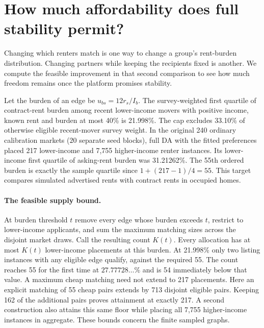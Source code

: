 \section{How much affordability does full stability permit?}\label{sec:burden}
Changing which renters match is one way to change a group's rent-burden distribution. Changing partners while keeping the recipients fixed is another. We compute the feasible improvement in that second comparison to see how much freedom remains once the platform promises stability.

Let the burden of an edge be $u_{bs}=12r_s/I_b$. The survey-weighted first quartile of contract-rent burden among recent lower-income movers with positive income, known rent and burden at most 40\% is 21.998\%. The cap excludes 33.10\% of otherwise eligible recent-mover survey weight. In the original 240 ordinary calibration markets ($20$ separate seed blocks), full DA with the fitted preferences placed 217 lower-income and 7,755 higher-income renter instances. Its lower-income first quartile of asking-rent burden was 31.21262\%. The 55th ordered burden is exactly the sample quartile since $1+(217-1)/4=55$. This target compares simulated advertised rents with contract rents in occupied homes.

\paragraph{The feasible supply bound.}
At burden threshold $t$ remove every edge whose burden exceeds $t$, restrict to lower-income applicants, and sum the maximum matching sizes across the disjoint market draws. Call the resulting count $K(t)$. Every allocation has at most $K(t)$ lower-income placements at this burden. At 21.998\% only two listing instances with any eligible edge qualify, against the required 55. The count reaches 55 for the first time at $27.77728\ldots\%$ and is 54 immediately below that value. A maximum cheap matching need not extend to 217 placements. Here an explicit matching of 55 cheap pairs extends by 713 disjoint eligible pairs. Keeping 162 of the additional pairs proves attainment at exactly 217. A second construction also attains this same floor while placing all 7,755 higher-income instances in aggregate. These bounds concern the finite sampled graphs.

